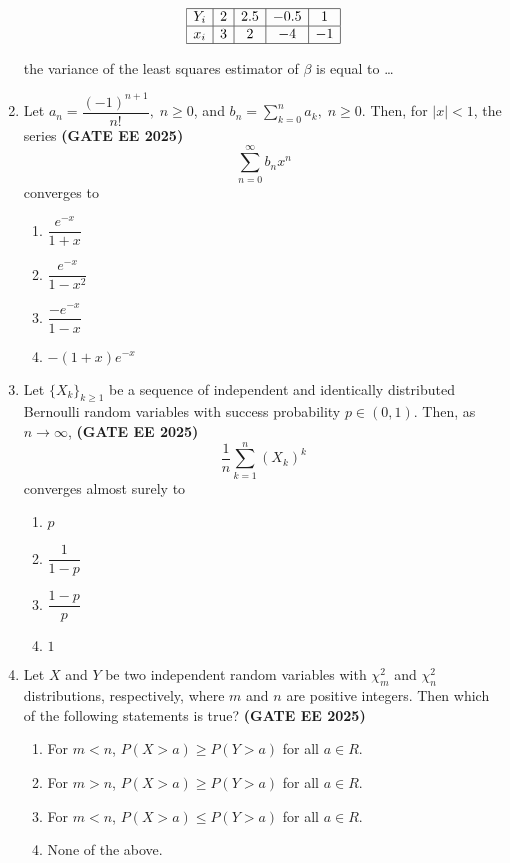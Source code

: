\documentclass[journal,12pt,onecolumn]{IEEEtran}
\theoremstyle{remark}
\begin{document}
\begin{enumerate}
\[
\begin{array}{|c|c|c|c|c|}
\hline
Y_i & 2 & 2.5 & -0.5 & 1 \\
\hline
x_i & 3 & 2 & -4 & -1 \\
\hline
\end{array}
\]

the variance of the least squares estimator of $\beta$ is equal to \ldots

\item Let $a_n = \dfrac{(-1)^{n+1}}{n!}, \; n \geq 0$, and $b_n = \sum_{k=0}^n a_k, \; n \geq 0$. Then, for $|x| < 1$, the series \hfill \textbf{(GATE EE 2025)}\\
\[
\sum_{n=0}^\infty b_n x^n 
\]
converges to
\begin{enumerate}
    \item $\dfrac{e^{-x}}{1+x}$
    \item $\dfrac{e^{-x}}{1-x^2}$
    \item $\dfrac{-e^{-x}}{1-x}$
    \item $-(1+x)e^{-x}$
\end{enumerate}
\item Let $\{X_k\}_{k \geq 1}$ be a sequence of independent and identically distributed Bernoulli random variables with success probability $p \in (0,1)$. Then, as $n \to \infty$, 
\hfill \textbf{(GATE EE 2025)}\\
\[
\dfrac{1}{n} \sum_{k=1}^n (X_k)^k
\]
converges almost surely to
\begin{enumerate}
    \item $p$
    \item $\dfrac{1}{1-p}$
    \item $\dfrac{1-p}{p}$
    \item $1$
\end{enumerate}
\item  Let $X$ and $Y$ be two independent random variables with $\chi_m^2$ and $\chi_n^2$ distributions, respectively, where $m$ and $n$ are positive integers. Then which of the following statements is true? \hfill \textbf{(GATE EE 2025)}\\

\begin{enumerate}
    \item For $m < n$, $P(X > a) \geq P(Y > a)$ for all $a \in R$.
    \item For $m > n$, $P(X > a) \geq P(Y > a)$ for all $a \in R$.
    \item For $m < n$, $P(X > a) \leq P(Y > a)$ for all $a \in R$.
    \item None of the above.
\end{enumerate}


\end{enumerate}
\end{document}
